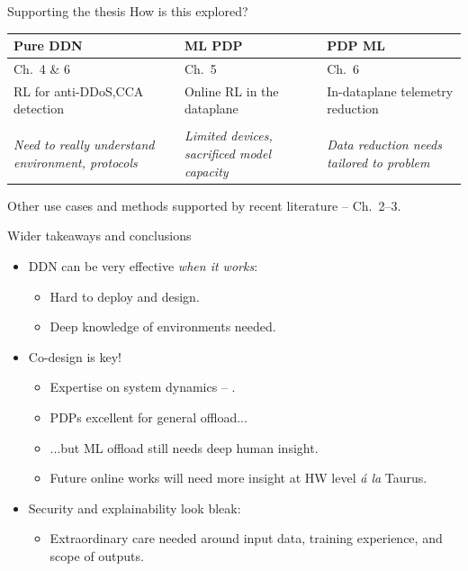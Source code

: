 \documentclass[aspectratio=169,xcolor={dvipsnames}]{beamer}
\begin{document}
	\begin{frame}{Supporting the thesis}
		How is this explored? 
		
		\begin{table}
			\centering\begin{tabular}{@{}C{4cm}C{4cm}C{4cm}@{}}
			\toprule Pure DDN & ML  PDP & PDP  ML \\
			\midrule \alert{Ch.\ 4 \& 6} & \alert{Ch.\ 5} & \alert{Ch.\ 6} \\
			RL for anti-DDoS,\newline CCA detection & Online RL in the dataplane & In-dataplane telemetry reduction \\ %
			 &  &  \\
			\emph{Need to really understand environment, protocols} & \emph{Limited devices, sacrificed model capacity} & \emph{Data reduction needs tailored to problem} \\
			\bottomrule
		\end{tabular}
			\end{table}
	
		Other use cases and methods supported by recent literature -- \alert{Ch.\ 2--3}.
	
	\end{frame}
	\begin{frame}{Wider takeaways and conclusions}
		\begin{itemize}
			\item DDN can be very effective \emph{when it works}:
			\begin{itemize}
				\item Hard to deploy and design.
				\item \alert{Deep knowledge of environments needed.}
			\end{itemize}
			\item Co-design is key!
			\begin{itemize}
				\item Expertise on system dynamics -- .
				\item PDPs excellent for general offload...
				\item ...but ML offload still needs deep human insight.
				\item Future online works will need more insight at HW level \emph{\'a la} Taurus.
			\end{itemize}
			\item Security and explainability look bleak:
			\begin{itemize}
				\item Extraordinary care needed around input data, training experience, and scope of outputs.
			\end{itemize}
		\end{itemize}
	\end{frame}
\end{document}
